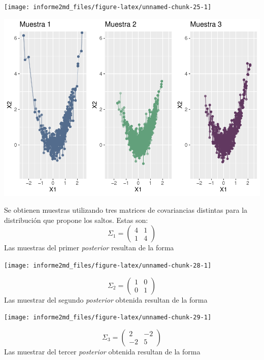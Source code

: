 \documentclass[
]{article}
\begin{document}
\begin{center}\texttt{[image: informe2md\_files/figure-latex/unnamed-chunk-25-1]} \end{center}

\begin{center}\includegraphics{informe2md_files/figure-latex/unnamed-chunk-26-1} \end{center}

Se obtienen muestras utilizando tres matrices de covariancias distintas
para la distribución que propone los saltos. Estas son:
\[\Sigma_1=\begin{pmatrix}
   4 & 1 \\
   1 & 4
\end{pmatrix} \] Las muestras del primer \emph{posterior} resultan de la
forma

\begin{center}\texttt{[image: informe2md\_files/figure-latex/unnamed-chunk-28-1]} \end{center}

\[\Sigma_2=\begin{pmatrix}
   1 & 0 \\
   0 & 1
\end{pmatrix} \] Las muestrar del segundo \emph{posterior} obtenida
resultan de la forma

\begin{center}\texttt{[image: informe2md\_files/figure-latex/unnamed-chunk-29-1]} \end{center}

\[\Sigma_3=\begin{pmatrix}
   2 & -2 \\
   -2 & 5
\end{pmatrix} \] Las muestrar del tercer \emph{posterior} obtenida
resultan de la forma
\end{document}
